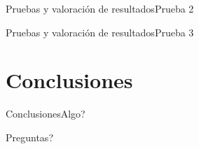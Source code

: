 \documentclass[aspectratio=169,14pt,spanish]{beamer}
\begin{document}
      \begin{frame}{Pruebas y valoración de resultados}{Prueba 2}


      \end{frame}

      \begin{frame}{Pruebas y valoración de resultados}{Prueba 3}


      \end{frame}

    \section{Conclusiones}

    \begin{frame}{Conclusiones}{Algo?}


    \end{frame}

    \begin{frame}

      Preguntas?
    \end{frame}
\end{document}
